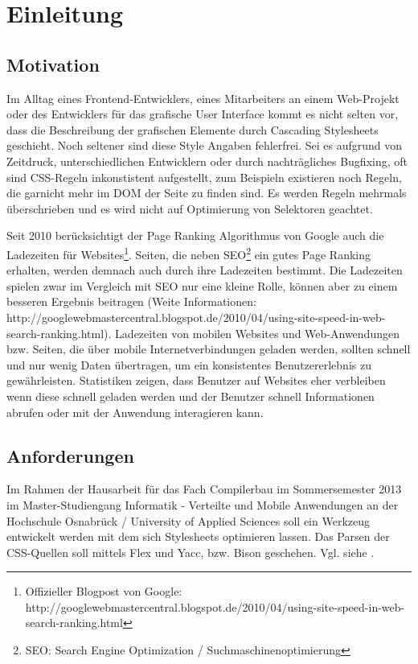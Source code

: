 \section{Einleitung}

\subsection{Motivation}
Im Alltag eines Frontend-Entwicklers, eines Mitarbeiters an einem Web-Projekt oder des Entwicklers für das grafische User Interface kommt es nicht selten vor, dass die Beschreibung der grafischen Elemente durch Cascading Stylesheets geschieht. Noch seltener sind diese Style Angaben fehlerfrei. Sei es aufgrund von Zeitdruck, unterschiedlichen Entwicklern oder durch nachträgliches Bugfixing, oft sind CSS-Regeln inkonstistent aufgestellt, zum Beispieln existieren noch Regeln, die garnicht mehr im DOM der Seite zu finden sind. Es werden Regeln mehrmals überschrieben und es wird nicht auf Optimierung von Selektoren geachtet. 

Seit 2010 berücksichtigt der Page Ranking Algorithmus von Google auch die Ladezeiten für Websites\footnote{Offizieller Blogpost von Google: http://googlewebmastercentral.blogspot.de/2010/04/using-site-speed-in-web-search-ranking.html}. Seiten, die neben SEO\footnote{SEO: Search Engine Optimization / Suchmaschinenoptimierung} ein gutes Page Ranking erhalten, werden demnach auch durch ihre Ladezeiten bestimmt. Die Ladezeiten spielen zwar im Vergleich mit SEO nur eine kleine Rolle, können aber zu einem besseren Ergebnis beitragen (Weite Informationen: http://googlewebmastercentral.blogspot.de/2010/04/using-site-speed-in-web-search-ranking.html).
Ladezeiten von mobilen Websites und Web-Anwendungen bzw. Seiten, die über mobile Internetverbindungen geladen werden, sollten schnell und nur wenig Daten übertragen, um ein konsistentes Benutzererlebnis zu gewährleisten. Statistiken zeigen, dass Benutzer auf Websites eher verbleiben wenn diese schnell geladen werden und der Benutzer schnell Informationen abrufen oder mit der Anwendung interagieren kann.

\subsection{Anforderungen}

Im Rahmen der Hausarbeit für das Fach Compilerbau im Sommersemester 2013 im Master-Studiengang Informatik - Verteilte und Mobile Anwendungen an der Hochschule Osnabrück / University of Applied Sciences soll ein Werkzeug entwickelt werden mit dem sich Stylesheets optimieren lassen. Das Parsen der CSS-Quellen soll mittels Flex und Yacc, bzw. Bison geschehen. Vgl. siehe \cite{appel_cc}.

